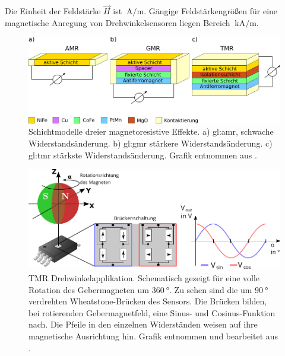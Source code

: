 Die Einheit der Feldstärke $\vec{H}$ ist $\SI{}{\ampere\per\metre}$. Gängige Feldstärkengrößen für eine magnetische 
Anregung von Drehwinkelsensoren liegen Bereich $\SI{}{\kilo\ampere\per\metre}$.

\begin{figure}[tbph]
	\centering
	\includegraphics[width=\linewidth]{chapters/images/MR_Schichtmodelle}
	\caption[Schichtmodelle dreier magnetoresistive Effekte]{Schichtmodelle dreier magnetoresistive Effekte. a) 
	\gls{gl:amr}, schwache Widerstandsänderung. b) \gls{gl:gmr} stärkere Widerstandsänderung. c) \gls{gl:tmr} stärkste 
	Widerstandsänderung. Grafik entnommen aus \cite{Lemme2016}.}
	\label{fig:mrschichtmodelle}
\end{figure}



\begin{figure}[tbph]
	\centering
	\includegraphics[width=\linewidth]{chapters/images/TMR_Drehwinkelapplikation}
	\caption[TMR Drehwinkelapplikation]{TMR Drehwinkelapplikation. Schematisch gezeigt für eine volle Rotation des 
	Gebermagneten um $\SI{360}{\degree}$. Zu sehen sind die um $\SI{90}{\degree}$ verdrehten Wheatstone-Brücken des 
	Sensors. Die Brücken bilden, bei rotierenden Gebermagnetfeld, eine Sinus- und Cosinus-Funktion nach. Die Pfeile in 
	den einzelnen Widerständen weisen auf ihre magnetische Ausrichtung hin. Grafik entnommen und bearbeitet aus 
	\cite{Schuethe2020a}.}
	\label{fig:tmrdrehwinkelapplikation}
\end{figure}


